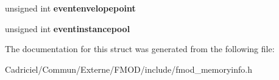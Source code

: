\begin{DoxyCompactItemize}
\item 
\hypertarget{struct_f_m_o_d___m_e_m_o_r_y___u_s_a_g_e___d_e_t_a_i_l_s_aeec51fe4108d9f383c5db076dcac34be}{unsigned int {\bfseries eventenvelopepoint}}\label{struct_f_m_o_d___m_e_m_o_r_y___u_s_a_g_e___d_e_t_a_i_l_s_aeec51fe4108d9f383c5db076dcac34be}

\item 
\hypertarget{struct_f_m_o_d___m_e_m_o_r_y___u_s_a_g_e___d_e_t_a_i_l_s_ac75baf7e2a3500aeab9a968276fa010c}{unsigned int {\bfseries eventinstancepool}}\label{struct_f_m_o_d___m_e_m_o_r_y___u_s_a_g_e___d_e_t_a_i_l_s_ac75baf7e2a3500aeab9a968276fa010c}

\end{DoxyCompactItemize}


The documentation for this struct was generated from the following file\-:\begin{DoxyCompactItemize}
\item 
Cadriciel/\-Commun/\-Externe/\-F\-M\-O\-D/include/fmod\-\_\-memoryinfo.\-h\end{DoxyCompactItemize}
